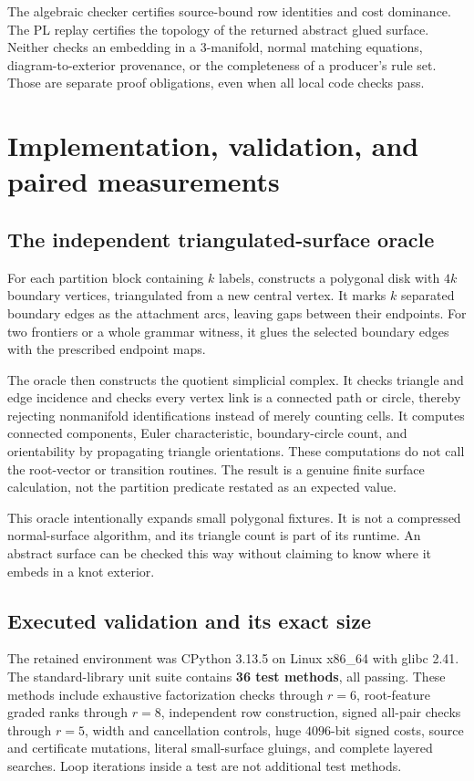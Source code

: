 \documentclass[11pt,a4paper]{article}
\theoremstyle{definition}
\theoremstyle{remark}
\begin{document}
The algebraic checker certifies source-bound row identities and cost dominance.
The PL replay certifies the topology of the returned abstract glued surface. Neither
checks an embedding in a 3-manifold, normal matching equations, diagram-to-exterior
provenance, or the completeness of a producer's rule set. Those are separate proof
obligations, even when all local code checks pass.

\section{Implementation, validation, and paired measurements}\label{sec:validation}
\subsection{The independent triangulated-surface oracle}
For each partition block containing $k$ labels, 
constructs a polygonal disk with $4k$ boundary vertices, triangulated from a new central
vertex. It marks $k$ separated boundary edges as the attachment arcs, leaving gaps
between their endpoints. For two frontiers or a whole grammar witness, it glues the
selected boundary edges with the prescribed endpoint maps.

The oracle then constructs the quotient simplicial complex. It checks triangle and
edge incidence and checks every vertex link is a connected path or circle, thereby
rejecting nonmanifold identifications instead of merely counting cells. It computes
connected components, Euler characteristic, boundary-circle count, and orientability
by propagating triangle orientations. These computations do not call the root-vector
or transition routines. The result is a genuine finite surface calculation, not the
partition predicate restated as an expected value.

This oracle intentionally expands small polygonal fixtures. It is not a compressed
normal-surface algorithm, and its triangle count is part of its runtime. An abstract
surface can be checked this way without claiming to know where it embeds in a knot
exterior.

\subsection{Executed validation and its exact size}
The retained environment was CPython 3.13.5 on Linux x86\_64 with glibc 2.41.
The standard-library unit suite contains \textbf{36 test methods}, all passing.
These methods include exhaustive factorization checks through $r=6$, root-feature
graded ranks through $r=8$, independent row construction, signed all-pair checks
through $r=5$, width and cancellation controls, huge $4096$-bit signed costs,
source and certificate mutations, literal small-surface gluings, and complete
layered searches. Loop iterations inside a test are not additional test methods.
\end{document}
